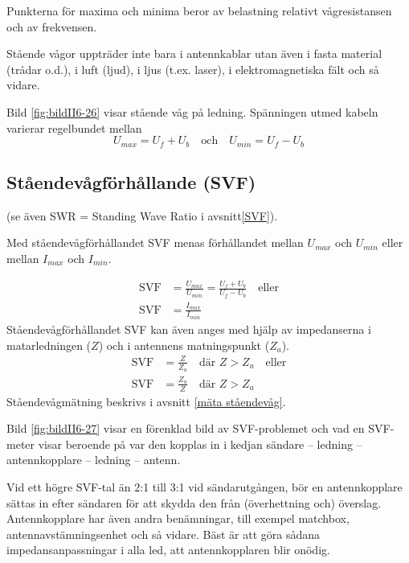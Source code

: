 Punkterna för maxima och minima beror av belastning relativt
vågresistansen och av frekvensen.

Stående vågor uppträder inte bara i antennkablar utan även i fasta material
(trådar o.d.), i luft (ljud), i ljus (t.ex. laser), i elektromagnetiska fält
och så vidare.


Bild \ref{fig:bildII6-26} visar stående våg på ledning.
Spänningen utmed kabeln varierar regelbundet mellan
\[U_{max} = U_f + U_b \quad \text{och} \quad U_{min} = U_f - U_b\]

\newpage %

\subsection{Ståendevågförhållande (SVF)}

(se även SWR = Standing Wave Ratio i avsnitt\ref{SVF}).

Med ståendevågförhållandet SVF menas förhållandet mellan \(U_{max}\)
och \(U_{min}\) eller mellan \(I_{max}\) och \(I_{min}\).

\begin{align*}
  \text{SVF} &= \frac{U_{max}}{U_{min}} = \frac{U_f + U_b}{U_f - U_b} \quad
  \text{eller} \\
  \text{SVF} &= \frac{I_{max}}{I_{min}}
\end{align*}
Ståendevågförhållandet SVF kan även anges med hjälp av impedanserna i
matarledningen (\(Z\)) och i antennens matningspunkt (\(Z_a\)).
\begin{align*}
  \text{SVF} &= \frac{Z}{Z_a} \quad \text{där } Z > Z_a \quad \text{eller} \\
  \text{SVF} &= \frac{Z_a}{Z} \quad \text{där } Z > Z_a
\end{align*}
Ståendevågmätning beskrivs i avsnitt \ref{mäta ståendevåg}.


Bild \ref{fig:bildII6-27} visar en förenklad bild av SVF-problemet och vad en
SVF-meter visar beroende på var den kopplas in i kedjan sändare -- ledning --
antennkopplare -- ledning -- antenn.

Vid ett högre SVF-tal än 2:1 till 3:1 vid sändarutgången, bör en antennkopplare
sättas in efter sändaren för att skydda den från (överhettning och) överslag.
Antennkopplare har även andra benämningar, till exempel matchbox,
antennavstämningsenhet och så vidare.
Bäst är att göra sådana impedansanpassningar i alla led, att antennkopplaren
blir onödig.

